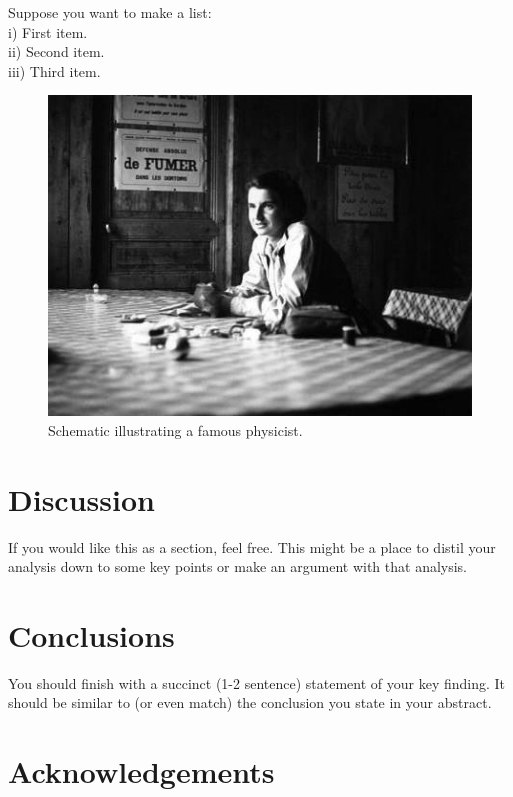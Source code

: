 \documentclass[aps,prl,reprint,10pt,amsmath,amssymb,superscriptaddress,a4paper]{revtex4-2}
\begin{document}
\lipsum[5] %

Suppose you want to make a list:\\

\noindent i) First item.\\

\noindent ii) Second item.\\

\noindent iii) Third item.\\

\lipsum[6] %

\lipsum[7] %

\begin{figure}
\includegraphics[width = 8 cm]{physicist}
\caption{Schematic illustrating a famous physicist.}
\end{figure}

\lipsum[8] %

\section{Discussion}

If you would like this as a section, feel free. This might be a place to distil your analysis down to some key points or make an argument with that analysis.

\lipsum[9] %

\lipsum[10] %

\section{Conclusions}

You should finish with a succinct (1-2 sentence) statement of your key finding. It should be similar to (or even match) the conclusion you state in your abstract.

\section{Acknowledgements}
\end{document}
